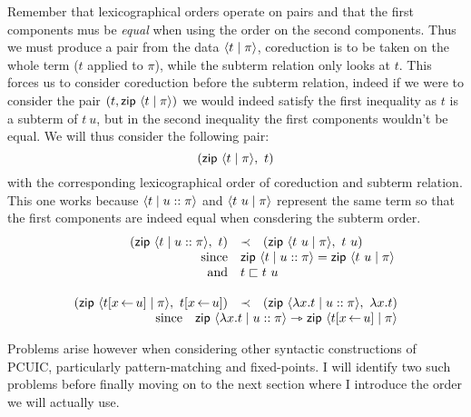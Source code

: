 Remember that lexicographical orders operate on pairs and that the first
components mus be \emph{equal} when using the order on the second components.
Thus we must produce a pair from the data \(\langle t \mid \pi \rangle\), coreduction is
to be taken on the whole term (\(t\) applied to \(\pi\)), while the subterm
relation only looks at \(t\).
This forces us to consider coreduction before the subterm relation, indeed if we
were to consider the pair \((t, \mathsf{zip}\ \langle t \mid \pi \rangle)\) we would indeed
satisfy the first inequality as \(t\) is a subterm of \(t\ u\), but in the
second inequality the first components wouldn't be equal.
We will thus consider the following pair:
\[
  (\mathsf{zip}\ \langle t \mid \pi \rangle,\ t)
\]
with the corresponding lexicographical order of coreduction and subterm
relation. This one works because \(\langle t \mid u :: \pi \rangle\) and
\(\langle t\ u \mid \pi \rangle\) represent the same term so that the first components
are indeed equal when consdering the subterm order.
\[
  \begin{array}{rcl}
    (\zip\ \dpair{t \mid u :: \pi},\ t) &\prec&
    (\zip\ \dpair{t\ u \mid \pi},\ t\ u) \\
    \text{since} &
    \multicolumn{2}{l}{
      \zip\ \dpair{t \mid u :: \pi} = \zip\ \dpair{t\ u \mid \pi}
    } \\
    \text{and} &
    \multicolumn{2}{l}{t \sqsubset t\ u} \\
    \\
    (\zip\ \dpair{t[x \sto u] \mid \pi},\ t[x \sto u]) &\prec&
    (\zip\ \dpair{\lambda x.t \mid u :: \pi},\ \lambda x.t) \\
    \multicolumn{3}{r}{
      \text{since} \quad
      \zip\ \dpair{\lambda x.t \mid u :: \pi} \red
      \zip\ \dpair{t[x \sto u] \mid \pi}
    }
  \end{array}
\]

Problems arise however when considering other syntactic constructions of
\acrshort{PCUIC}, particularly pattern-matching and fixed-points.
I will identify two such problems before finally moving on to the next section
where I introduce the order we will actually use.

